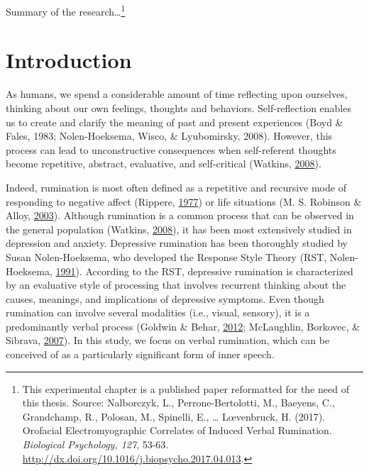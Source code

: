 \documentclass[a4paper,12pt,twoside,openright,oldfontcommands]{memoir}
\let\rmarkdownfootnote\footnote%
\def\footnote{\protect\rmarkdownfootnote}
\begin{document}
Summary of the research\ldots{}\footnote{This experimental chapter is a
  published paper reformatted for the need of this thesis. Source:
  Nalborczyk, L., Perrone-Bertolotti, M., Baeyens, C., Grandchamp, R.,
  Polosan, M., Spinelli, E., \ldots{} L\oe venbruck, H. (2017).
  Orofacial Electromyographic Correlates of Induced Verbal Rumination.
  \emph{Biological Psychology, 127}, 53-63.
  \url{http://dx.doi.org/10.1016/j.biopsycho.2017.04.013}.}

\section{Introduction}\label{introduction}

As humans, we spend a considerable amount of time reflecting upon
ourselves, thinking about our own feelings, thoughts and behaviors.
Self-reflection enables us to create and clarify the meaning of past and
present experiences (Boyd \& Fales, 1983; Nolen-Hoeksema, Wisco, \&
Lyubomirsky, 2008). However, this process can lead to unconstructive
consequences when self-referent thoughts become repetitive, abstract,
evaluative, and self-critical (Watkins,
\protect\hyperlink{ref-Watkins2008}{2008}).

Indeed, rumination is most often defined as a repetitive and recursive
mode of responding to negative affect (Rippere,
\protect\hyperlink{ref-Rippere1977}{1977}) or life situations (M. S.
Robinson \& Alloy, \protect\hyperlink{ref-Robinson2003}{2003}). Although
rumination is a common process that can be observed in the general
population (Watkins, \protect\hyperlink{ref-Watkins2008}{2008}), it has
been most extensively studied in depression and anxiety. Depressive
rumination has been thoroughly studied by Susan Nolen-Hoeksema, who
developed the Response Style Theory (RST, Nolen-Hoeksema,
\protect\hyperlink{ref-nolen-hoeksema_responses_1991}{1991}). According
to the RST, depressive rumination is characterized by an evaluative
style of processing that involves recurrent thinking about the causes,
meanings, and implications of depressive symptoms. Even though
rumination can involve several modalities (i.e., visual, sensory), it is
a predominantly verbal process (Goldwin \& Behar,
\protect\hyperlink{ref-goldwin_concreteness_2012}{2012}; McLaughlin,
Borkovec, \& Sibrava,
\protect\hyperlink{ref-mclaughlin_effects_2007}{2007}). In this study,
we focus on verbal rumination, which can be conceived of as a
particularly significant form of inner speech.
\end{document}
